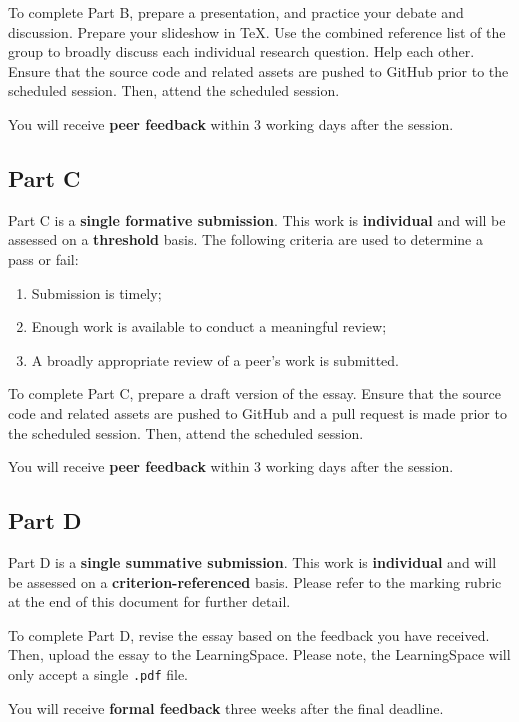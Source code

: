 \documentclass{../fal_assignment}
\begin{document}
To complete Part B, prepare a presentation, and practice your debate and discussion. Prepare your slideshow in TeX. Use the combined reference list of the group to broadly discuss each individual research question. Help each other. Ensure that the source code and related assets are pushed to GitHub prior to the scheduled session. Then, attend the scheduled session.

You will receive \textbf{peer feedback} within 3 working days after the session.

\subsection*{Part C}

Part C is a \textbf{single formative submission}. This work is \textbf{individual} and will be assessed on a \textbf{threshold} basis. The following criteria are used to determine a pass or fail:

\begin{enumerate}[label=(\alph*)]
	\item Submission is timely;
	\item Enough work is available to conduct a meaningful review;
	\item A broadly appropriate review of a peer's work is submitted.
\end{enumerate}

To complete Part C, prepare a draft version of the essay. Ensure that the source code and related assets are pushed to GitHub and a pull request is made prior to the scheduled session. Then, attend the scheduled session.

You will receive \textbf{peer feedback} within 3 working days after the session.

\subsection*{Part D}

Part D is a \textbf{single summative submission}. This work is \textbf{individual} and will be assessed on a \textbf{criterion-referenced} basis. Please refer to the marking rubric at the end of this document for further detail.

To complete Part D, revise the essay based on the feedback you have received. Then, upload the essay to the LearningSpace. Please note, the LearningSpace will only accept a single \texttt{.pdf} file.

You will receive \textbf{formal feedback} three weeks after the final deadline.
\end{document}
